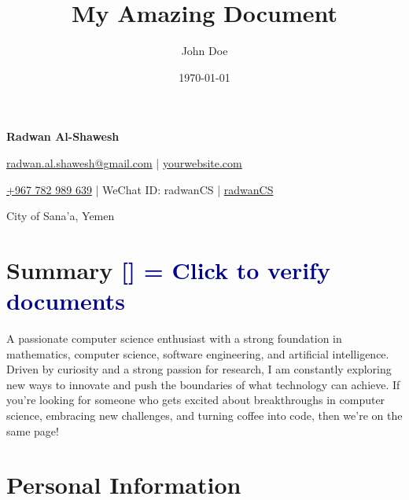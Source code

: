 \documentclass[a4paper,11pt]{article}
\title{My Amazing Document}
\author{John Doe}
\date{\today}  %
\newcommand{\socialicon}[1]{\raisebox{-0.05em}{\resizebox{!}{1em}{#1}}}
\newcommand{\headerfontiii}{\fontfamily{ppl}\selectfont} %
\begin{document}
	\headerfontiii
	
	\begin{center}
		{\Huge\textbf{Radwan Al-Shawesh}}
	\end{center}
	\vspace{-6mm}
	
	\begin{center}
		\small{
			\href{mailto:radwan.al.shawesh@gmail.com}{radwan.al.shawesh@gmail.com} | 
			\href{https://www.yourwebsite.com/}{yourwebsite.com}
		}
	\end{center}
	\vspace{-6mm}
	
	\begin{center}
		\small{
			\socialicon{\faWhatsappSquare} \href{https://wa.me/967782989639}{+967 782 989 639} |
			\socialicon{\faWeixin} WeChat ID: radwanCS |
			\socialicon{\faGithub} \href{https://github.com/radwanCS}{radwanCS}
		}
	\end{center}
	\vspace{-6mm}
	
	\begin{center}
		\small{City of Sana'a, Yemen}
	\end{center}
	\vspace{-4mm}

	\section{\textbf{Summary} \hspace*{\fill} 
    \textcolor{darkblue}{\scriptsize [\href{https://1drv.ms/f/c/0b66680558f854cf/EmMcNN-2rp5JkBqREvrLziABZw0qcxK9gYBRxxkRwz2g9A?e=Dd3Xgb}{\texorpdfstring{\faGlobe}{Clickable Link}}] = Click to verify documents}
	}
	\vspace{1mm}
	\small{
		A passionate computer science enthusiast with a strong foundation in mathematics, computer science, software engineering, and 
		artificial intelligence. Driven by curiosity and a strong passion for research, I am constantly exploring new ways to innovate 
		and push the boundaries of what technology can achieve. If you're looking for someone who gets excited about breakthroughs in computer science, 
		embracing new challenges, and turning coffee into code, then we’re on the same page!
	}
	\vspace{-2mm}
	
	\section{\textbf{Personal Information}}
	\vspace{2mm}
	
\end{document}
